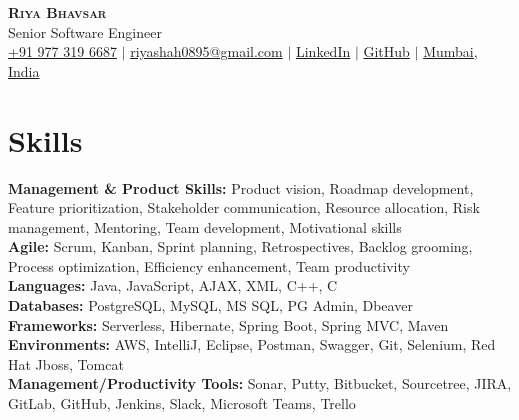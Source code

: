 \documentclass[letterpaper,11pt]{article}
\newcommand{\resumeSubHeadingListStart}{\begin{itemize}[leftmargin=0.15in, label={}]}
\newcommand{\resumeSubHeadingListEnd}{\end{itemize}}
\begin{document}

\begin{center}
  \textbf{\Huge \scshape Riya Bhavsar} \\ \vspace{3pt}
  \normalsize Senior Software Engineer \\ \vspace{3pt}
  \small
  \faMobile \hspace{.5pt} \href{tel:9773196687}{+91 977 319 6687}
  $|$
  \faAt \hspace{.5pt} \href{mailto:riyashah0895@gmail.com}{riyashah0895@gmail.com}
  $|$
  \faLinkedinSquare \hspace{.5pt} \href{https://www.linkedin.com/in/riya-j-bhavsar/}{LinkedIn}
  $|$
  \faGithub \hspace{.5pt} \href{https://github.com/riya-bhavsar}{GitHub}
  $|$
  \faMapMarker \hspace{.5pt} \href{https://goo.gl/maps/Czh1vXePukiKumpu5}{Mumbai, India}
\end{center}



\section{Skills}
\vspace{2pt}
\resumeSubHeadingListStart
\small{\item{
  \textbf{Management \& Product Skills:}{ Product vision, Roadmap development, Feature prioritization, Stakeholder communication, Resource allocation, Risk management, Mentoring, Team development, Motivational skills} \\ \vspace{3pt}
  \textbf{Agile:}{ Scrum, Kanban, Sprint planning, Retrospectives, Backlog grooming, Process optimization, Efficiency enhancement, Team productivity} \\ \vspace{3pt}
  \textbf{Languages:}{ Java, JavaScript, AJAX, XML, C++, C } \\ \vspace{3pt}
  \textbf{Databases:}{ PostgreSQL, MySQL, MS SQL, PG Admin, Dbeaver } \\ \vspace{3pt}
  \textbf{Frameworks:}{ Serverless, Hibernate, Spring Boot, Spring MVC, Maven } \\ \vspace{3pt}
  \textbf{Environments:}{ AWS, IntelliJ, Eclipse, Postman, Swagger, Git, Selenium, Red Hat Jboss, Tomcat } \\ \vspace{3pt}
  \textbf{Management/Productivity Tools:}{ Sonar, Putty, Bitbucket, Sourcetree, JIRA, GitLab, GitHub, Jenkins, Slack, Microsoft Teams, Trello } \\ \vspace{3pt}
}}
\resumeSubHeadingListEnd
\end{document}
